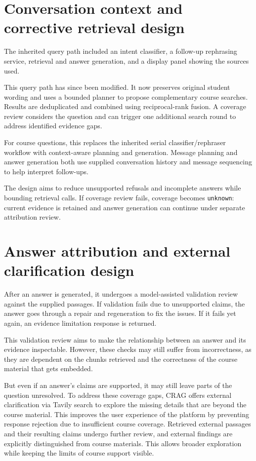 \section{Conversation context and corrective retrieval design}
The inherited query path included an intent classifier, a follow-up rephrasing service, retrieval and answer generation, and a display panel showing the sources used.

This query path has since been modified. It now preserves original student wording and uses a bounded planner to propose complementary course searches. Results are deduplicated and combined using reciprocal-rank fusion. A coverage review considers the question and can trigger one additional search round to address identified evidence gaps.

For course questions, this replaces the inherited serial classifier/rephraser workflow with context-aware planning and generation. Message planning and answer generation both use supplied conversation history and message sequencing to help interpret follow-ups.

The design aims to reduce unsupported refusals and incomplete answers while bounding retrieval calls. If coverage review fails, coverage becomes \texttt{unknown}: current evidence is retained and answer generation can continue under separate attribution review.

\section{Answer attribution and external clarification design}
After an answer is generated, it undergoes a model-assisted validation review against the supplied passages. If validation fails due to unsupported claims, the answer goes through a repair and regeneration to fix the issues. If it fails yet again, an evidence limitation response is returned.

This validation review aims to make the relationship between an answer and its evidence inspectable. However, these checks may still suffer from incorrectness, as they are dependent on the chunks retrieved and the correctness of the course material that gets embedded.

But even if an answer's claims are supported, it may still leave parts of the question unresolved. To address these coverage gaps, CRAG offers external clarification via Tavily search to explore the missing details that are beyond the course material. This improves the user experience of the platform by preventing response rejection due to insufficient course coverage. Retrieved external passages and their resulting claims undergo further review, and external findings are explicitly distinguished from course materials. This allows broader exploration while keeping the limits of course support visible.


